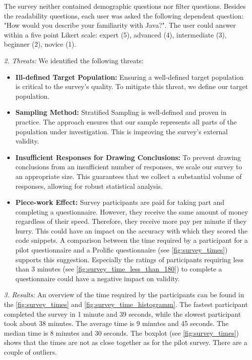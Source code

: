 \documentclass[%
class=scrreprt,
chapterprefix=false,%
open=right,%
twoside=false,%
paper=a4,%
logofile={Logo\_zentral\_farbig\_EN.png},%
thesistype=master,%
UKenglish,%
]{se2thesis}
\theoremstyle{definition}
\begin{document}
	The survey neither contained demographic questions nor filter questions. Besides the readability questions, each user was asked the following dependent question: "How would you describe your familiarity with Java?". The user could answer within a five point Likert scale: expert (5), advanced (4), intermediate (3), beginner (2), novice (1).
	
\textit{2. Threats:}
	We identified the following threats:
	\begin{itemize}
		\item \textbf{Ill-defined Target Population:} Ensuring a well-defined target population is critical to the survey's quality. To mitigate this threat, we define our target population.
		
		\item \textbf{Sampling Method:} Stratified Sampling is well-defined and proven in practice. The approach ensures that our sample represents all parts of the population under investigation. This is improving the survey's external validity.
		
		\item \textbf{Insufficient Responses for Drawing Conclusions:} To prevent drawing conclusions from an insufficient number of responses, we scale our survey to an appropriate size. This guarantees that we collect a substantial volume of responses, allowing for robust statistical analysis.
		
		\item \textbf{Piece-work Effect:} Survey participants are paid for taking part and completing a questionnaire. However, they receive the same amount of money regardless of their speed. Therefore, they receive more pay per minute if they hurry. This could have an impact on the accuracy with which they scored the code snippets. A comparison between the time required by a participant for a pilot questionnaire and a Prolific questionnaire (see \autoref{fig:survey_times}) supports this suggestion. Especially the ratings of participants requiring less than 3 minutes (see \autoref{fig:survey_time_less_than_180}) to complete a questionnaire could have a negative impact on validity. 
	\end{itemize}
	
\textit{3. Results:}
	An overview of the time required by the participants can be found in the \autoref{fig:survey_times} and \autoref{fig:survey_time_histogramm}.
	The fastest participant completed the survey in 1 minute and 39 seconds, while the slowest participant took about 38 minutes. 
	The average time is 9 minutes and 45 seconds. The median time is 8 minutes and 30 seconds. The boxplot (see \autoref{fig:survey_times}) shows that the times are not as close together as for the pilot survey. There are a couple of outliers.
		
\end{document}
